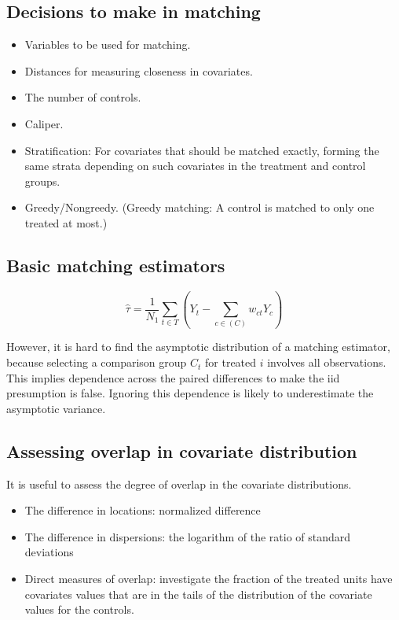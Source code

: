 \documentclass[
]{ctexart}
\providecommand{\tightlist}{%
  \setlength{\itemsep}{0pt}\setlength{\parskip}{0pt}}
\newcommand{\0}{\textbf 0}
\newcommand{\1}{\textbf 1}
\def\pr#1{\left(#1\right)}
\begin{document}
\hypertarget{decisions-to-make-in-matching}{%
\subsection{Decisions to make in
matching}\label{decisions-to-make-in-matching}}

\begin{itemize}
\tightlist
\item
  Variables to be used for matching.
\item
  Distances for measuring closeness in covariates.
\item
  The number of controls.
\item
  Caliper.
\item
  Stratification: For covariates that should be matched exactly, forming
  the same strata depending on such covariates in the treatment and
  control groups.
\item
  Greedy/Nongreedy. (Greedy matching: A control is matched to only one
  treated at most.)
\end{itemize}

\hypertarget{basic-matching-estimators}{%
\subsection{Basic matching estimators}\label{basic-matching-estimators}}

\[
\hat\tau = \frac1{N_1}\sum_{t\in T}\pr{Y_t-\sum_{c\in\pr{C}}w_{ct}Y_c}
\]

However, it is hard to find the asymptotic distribution of a matching
estimator, because selecting a comparison group \(C_t\) for treated
\(i\) involves all observations. This implies dependence across the
paired differences to make the iid presumption is false. Ignoring this
dependence is likely to underestimate the asymptotic variance.

\hypertarget{assessing-overlap-in-covariate-distribution}{%
\subsection{Assessing overlap in covariate
distribution}\label{assessing-overlap-in-covariate-distribution}}

It is useful to assess the degree of overlap in the covariate
distributions.

\begin{itemize}
\tightlist
\item
  The difference in locations: normalized difference
\item
  The difference in dispersions: the logarithm of the ratio of standard
  deviations
\item
  Direct measures of overlap: investigate the fraction of the treated
  units have covariates values that are in the tails of the distribution
  of the covariate values for the controls.
\end{itemize}
\end{document}
